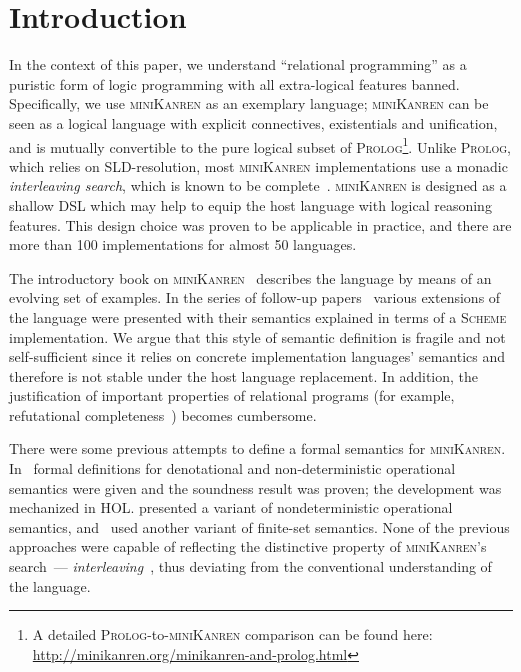 \section{Introduction}

In the context of this paper, we understand ``relational programming'' as a puristic form of logic programming with all extra-logical
features banned. Specifically, we use \textsc{miniKanren} as an exemplary language; \textsc{miniKanren} can be seen as
a logical language with explicit connectives, existentials and unification, and is mutually convertible to the pure logical subset of
\textsc{Prolog}\footnote{A detailed \textsc{Prolog}-to-\textsc{miniKanren} comparison can be found here: \url{http://minikanren.org/minikanren-and-prolog.html}}.
Unlike \textsc{Prolog}, which relies on SLD-resolution, most \textsc{miniKanren} implementations use a monadic \emph{interleaving
search}, which is known to be complete~\cite{2016}.
\textsc{miniKanren} is designed as a shallow DSL which may help to equip the host language with logical reasoning features. This
design choice was proven to be applicable in practice, and there are more than 100 implementations for almost 50 languages.

The introductory book on \textsc{miniKanren}~\cite{TRS} describes the language by means of an evolving set of examples. In the
series of follow-up papers~\cite{MicroKanren,CKanren,CKanren1,AlphaKanren,2016,Guided} various extensions of the language were presented with
their semantics explained in terms of a \textsc{Scheme} implementation. We argue that this style of semantic definition is
fragile and not self-sufficient since it relies on concrete implementation languages' semantics and therefore is not stable under the host language replacement.
In addition, the justification of important properties of relational programs (for example, refutational completeness~\cite{WillThesis}) becomes cumbersome.

There were some previous attempts to define a formal semantics for \textsc{miniKanren}. In~\cite{MechanisingMiniKanren} formal definitions
for denotational and non-deterministic operational semantics were given and the soundness result was proven; the development was mechanized in HOL. 
\cite{RelConversion} presented a variant of nondeterministic operational semantics, and~\cite{DivTest} used another variant of finite-set semantics.
None of the previous approaches were capable of reflecting the distinctive property of \textsc{miniKanren}'s search~--- \emph{interleaving}~\cite{Search},
thus deviating from the conventional understanding of the language.

